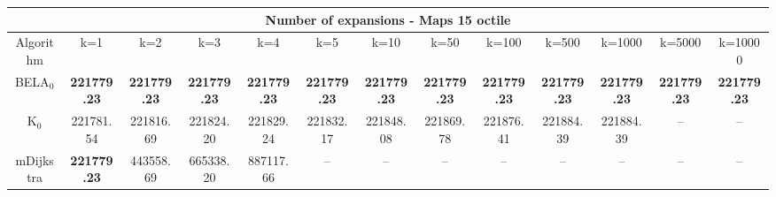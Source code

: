 \begin{tabular}{c|cccccccccccc}\toprule
\multicolumn{13}{c}{Number of expansions - Maps 15 octile}\\ \midrule
Algorithm & k=1 & k=2 & k=3 & k=4 & k=5 & k=10 & k=50 & k=100 & k=500 & k=1000 & k=5000 & k=10000 \\ \midrule
BELA$_0$ & \textbf{221779.23} & \textbf{221779.23} & \textbf{221779.23} & \textbf{221779.23} & \textbf{221779.23} & \textbf{221779.23} & \textbf{221779.23} & \textbf{221779.23} & \textbf{221779.23} & \textbf{221779.23} & \textbf{221779.23} & \textbf{221779.23} \\
K$_0$ & 221781.54 & 221816.69 & 221824.20 & 221829.24 & 221832.17 & 221848.08 & 221869.78 & 221876.41 & 221884.39 & 221884.39 & -- & -- \\
mDijkstra & \textbf{221779.23} & 443558.69 & 665338.20 & 887117.66 & -- & -- & -- & -- & -- & -- & -- & -- \\ \bottomrule 
\end{tabular}
